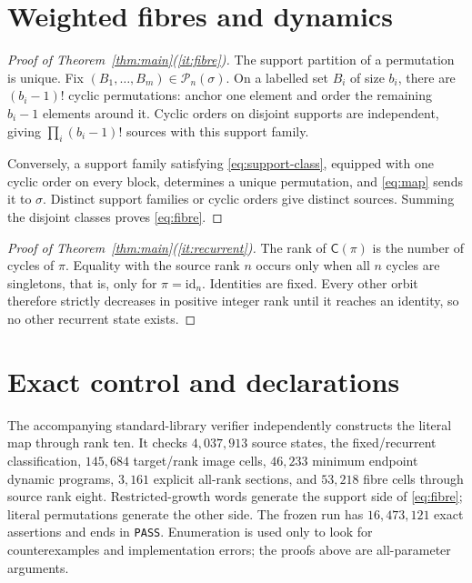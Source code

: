 \documentclass[a4paper,10pt]{amsart}
\theoremstyle{remark}
\newcommand{\CME}{\mathsf C}
\begin{document}
\section{Weighted fibres and dynamics}\label{sec:fibre}

\begin{proof}[Proof of Theorem~\ref{thm:main}(\ref{it:fibre})]
The support partition of a permutation is unique.  Fix
$(B_1,\ldots,B_m)\in\mathcal P_n(\sigma)$.  On a labelled set $B_i$ of size
$b_i$, there are $(b_i-1)!$ cyclic permutations: anchor one element and order
the remaining $b_i-1$ elements around it.  Cyclic orders on disjoint supports
are independent, giving $\prod_i(b_i-1)!$ sources with this support family.

Conversely, a support family satisfying \eqref{eq:support-class}, equipped
with one cyclic order on every block, determines a unique permutation, and
\eqref{eq:map} sends it to $\sigma$.  Distinct support families or cyclic
orders give distinct sources.  Summing the disjoint classes proves
\eqref{eq:fibre}.
\end{proof}

\begin{proof}[Proof of Theorem~\ref{thm:main}(\ref{it:recurrent})]
The rank of $\CME(\pi)$ is the number of cycles of $\pi$.  Equality with the
source rank $n$ occurs only when all $n$ cycles are singletons, that is, only
for $\pi=\mathrm{id}_n$.  Identities are fixed.  Every other orbit therefore
strictly decreases in positive integer rank until it reaches an identity, so
no other recurrent state exists.
\end{proof}

\section{Exact control and declarations}\label{sec:control}

The accompanying standard-library verifier independently constructs the
literal map through rank ten.  It checks $4{,}037{,}913$ source states, the
fixed/recurrent classification, $145{,}684$ target/rank image cells, $46{,}233$
minimum endpoint dynamic programs, $3{,}161$ explicit all-rank sections, and
$53{,}218$ fibre cells through source rank eight.  Restricted-growth words
generate the support side of \eqref{eq:fibre}; literal permutations generate
the other side.  The frozen run has $16{,}473{,}121$ exact assertions and ends
in \texttt{PASS}.  Enumeration is used only to look for counterexamples and
implementation errors; the proofs above are all-parameter arguments.
\end{document}
